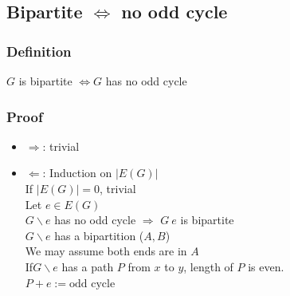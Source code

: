     \subsection{Bipartite $\Leftrightarrow$ no odd cycle}
        \subsubsection{Definition}
            $G$ is bipartite $\Leftrightarrow G$ has no odd cycle
        \subsubsection{Proof}
            \begin{itemize}
                \item $\Rightarrow$: trivial
                \item $\Leftarrow$: Induction on $|E(G)|$\\
                    If $|E(G)|=0$, trivial\\
                    Let $e\in E(G)$\\
                    $G\backslash e$ has no odd cycle $\Rightarrow$ $G\ e$ is bipartite\\
                    $G\backslash e$ has a bipartition ($A, B$)\\
                    We may assume both ends are in $A$\\
                    If$G\backslash e$ has a path $P$ from $x$ to $y$, length of $P$ is even.\\
                    $P+e:=\text{odd cycle}$
            \end{itemize}
